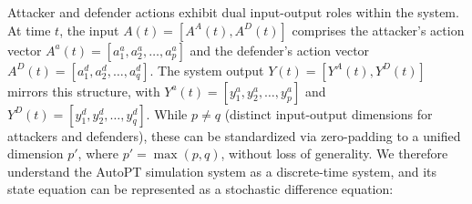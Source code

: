 Attacker and defender actions exhibit dual input-output roles within the system. At time $t$, the input $A(t) = [A^A(t), A^D(t)]$ comprises the attacker’s action vector $A^a(t) = [a^a_1, a^a_2, \dots, a^a_p]$ and the defender’s action vector $A^D(t) = [a^d_1, a^d_2, \dots, a^d_q]$. The system output $Y(t) = [Y^A(t), Y^D(t)]$ mirrors this structure, with $Y^a(t) = [y^a_1, y^a_2, \dots, y^a_p]$ and $Y^D(t) = [y^d_1, y^d_2, \dots, y^d_q]$. While $p\neq q$ (distinct input-output dimensions for attackers and defenders), these can be standardized via zero-padding to a unified dimension $p'$, where $p' = \max(p, q)$, without loss of generality.
We therefore understand the AutoPT simulation system as a discrete-time system, and its state equation can be represented as a stochastic difference equation:





